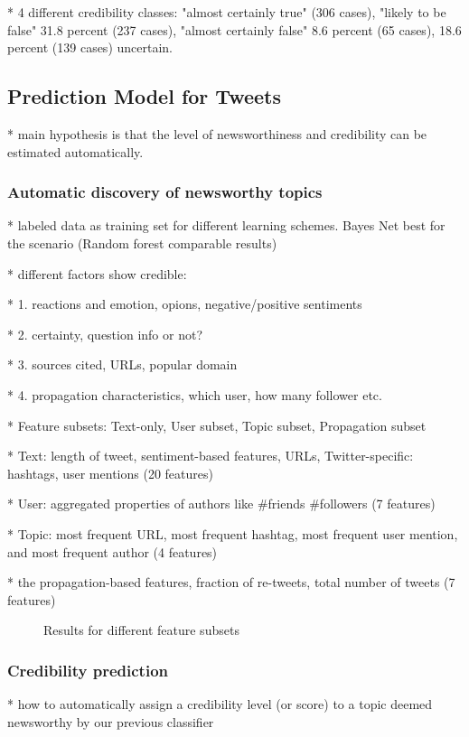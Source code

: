 \documentclass{proseminar}
\begin{document}
* 4 different credibility classes: "almost certainly true" (306 cases), "likely to be false" 31.8 percent (237 cases), "almost certainly false" 8.6
percent (65 cases), 18.6 percent (139 cases) uncertain.

\subsection{Prediction Model for Tweets}
* main hypothesis is that the level of newsworthiness and credibility can be estimated automatically.

\subsubsection*{Automatic discovery of newsworthy topics}
* labeled data as training set for different learning schemes. Bayes Net best for the scenario (Random forest comparable results)

* different factors show credible:

* 1. reactions and emotion, opions, negative/positive sentiments 

* 2. certainty, question info or not?

* 3. sources cited, URLs, popular domain

* 4. propagation characteristics, which user, how many follower etc.

* Feature subsets: Text-only, User subset, Topic subset, Propagation subset

* Text: length of tweet, sentiment-based features, URLs, Twitter-specific: hashtags, user mentions (20 features)

* User: aggregated properties of authors like \#friends \#followers (7 features)

* Topic: most frequent URL, most frequent hashtag, most frequent user mention, and most frequent author (4 features)

* the propagation-based features, fraction of re-tweets, total number of tweets (7 features)

\begin{figure}[h]
\centering
{}
\caption{Results for different feature subsets}
\end{figure}

\subsubsection*{Credibility prediction}
* how to automatically assign a credibility level (or score) to a topic deemed newsworthy by our previous classifier
\end{document}
